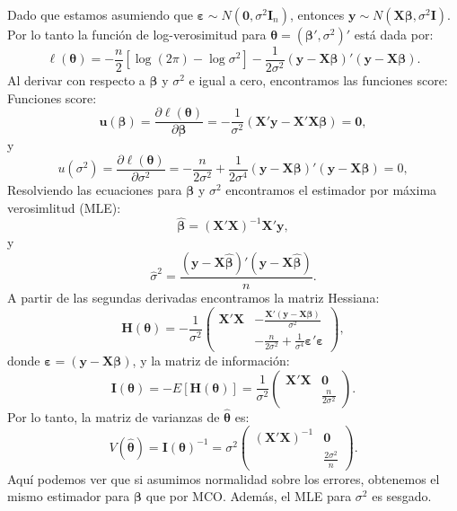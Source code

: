 \documentclass[
]{article}
\begin{document}
Dado que estamos asumiendo que \(\boldsymbol \varepsilon\sim N(\boldsymbol 0, \sigma^{2}\boldsymbol I_{n})\), entonces \(\boldsymbol y\sim N(\boldsymbol X\boldsymbol \beta,\sigma^2\boldsymbol I)\). Por lo tanto la función de log-verosimitud para \(\boldsymbol \theta= (\boldsymbol \beta',\sigma^2)'\) está dada por:
\[
\ell(\boldsymbol \theta) = -\frac{n}{2} \left[ \log(2\pi) - \log \sigma^2 \right] - \frac{1}{2\sigma^2}(\boldsymbol y- \boldsymbol X\boldsymbol \beta)'(\boldsymbol y- \boldsymbol X\boldsymbol \beta).
\]
Al derivar con respecto a \(\boldsymbol \beta\) y \(\sigma^2\) e igual a cero, encontramos las funciones score:
Funciones score:
\[
\boldsymbol u(\boldsymbol \beta) = \frac{\partial \ell(\boldsymbol \theta)}{\partial \boldsymbol \beta} = - \frac{1}{\sigma^{2}}(\boldsymbol X'\boldsymbol y- \boldsymbol X'\boldsymbol X\boldsymbol \beta) = \boldsymbol 0,
\]
y
\[
u(\sigma^{2}) = \frac{\partial \ell(\boldsymbol \theta)}{\partial \sigma^{2}} = - \frac{n}{2\sigma^{2}} + \frac{1}{2\sigma^{4}}(\boldsymbol y- \boldsymbol X\boldsymbol \beta)'(\boldsymbol y- \boldsymbol X\boldsymbol \beta) = 0,
\]
Resolviendo las ecuaciones para \(\boldsymbol \beta\) y \(\sigma^{2}\) encontramos el estimador por máxima verosimlitud (MLE):
\[
\widehat{\boldsymbol \beta}= (\boldsymbol X'\boldsymbol X)^{-1}\boldsymbol X'\boldsymbol y,
\]
y
\[
\widehat{\sigma}^{2} = \frac{(\boldsymbol y- \boldsymbol X\widehat{\boldsymbol \beta})'(\boldsymbol y- \boldsymbol X\widehat{\boldsymbol \beta})}{n}.
\]
A partir de las segundas derivadas encontramos la matriz Hessiana:
\[
\boldsymbol H(\boldsymbol \theta) = - \frac{1}{\sigma^{2}}\begin{pmatrix}
\boldsymbol X'\boldsymbol X& -\frac{\boldsymbol X'(\boldsymbol y- \boldsymbol X\boldsymbol \beta)}{\sigma^{2}} \\
 & -\frac{n}{2\sigma^{2}} +  \frac{1}{\sigma^{4}}\boldsymbol \varepsilon'\boldsymbol \varepsilon
\end{pmatrix},
\]
donde \(\boldsymbol \varepsilon= (\boldsymbol y- \boldsymbol X\boldsymbol \beta)\), y la matriz de información:
\[
\boldsymbol I(\boldsymbol \theta) = - E[\boldsymbol H(\boldsymbol \theta)] = \frac{1}{\sigma^{2}} \begin{pmatrix}
\boldsymbol X'\boldsymbol X& \boldsymbol 0\\  & \frac{n}{2\sigma^{2}} 
\end{pmatrix} .
\]
Por lo tanto, la matriz de varianzas de \(\widehat{\boldsymbol \theta}\) es:
\[
V(\widehat{\boldsymbol \theta}) = \boldsymbol I(\boldsymbol \theta)^{-1} = \sigma^{2} \begin{pmatrix}
(\boldsymbol X'\boldsymbol X)^{-1} & \boldsymbol 0\\  & \frac{2\sigma^{2}}{n} 
\end{pmatrix}.
\]
Aquí podemos ver que si asumimos normalidad sobre los errores, obtenemos el mismo estimador para \(\boldsymbol \beta\) que por MCO. Además, el MLE para \(\sigma^2\) es sesgado.
\end{document}
